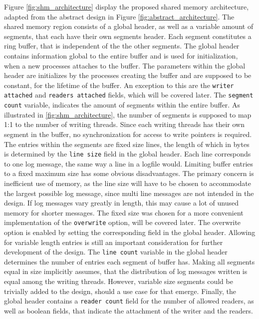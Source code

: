 Figure \ref{fig:shm_architecture} display the proposed shared memory architecture, adapted from the abstract design in Figure \ref{fig:abstract_architecture}.
The shared memory region consists of a global header, as well as a variable amount of segments,
that each have their own segments header. Each segment constitutes a ring buffer, that is independent of the
the other segments. The global header contains information global to
the entire buffer and is used for initialization, when a new processes attaches to the buffer. The parameters within the global
header are initializes by the processes creating the buffer and are supposed to be constant, for the lifetime of the buffer. An exception to this 
are the \texttt{writer attached} and \texttt{readers attached} fields, which will be covered later.
The \texttt{segment count} variable, indicates the amount of segments within the entire buffer. As illustrated
in \ref{fig:shm_architecture}, the number of segments is supposed to map 1:1 to the number 
of writing threads. Since each writing threads has their own segment in the buffer, no synchronization for access
to write pointers is required. The entries within the segments are fixed
size lines, the length of which in bytes is determined by the \texttt{line size} field in the global header. Each line corresponds
to one log message, the same way a line in a logfile would.  
Limiting buffer entries to a fixed maximum size has some obvious disadvantages. The primary concern
is inefficient use of memory, as the line size will have to be chosen to accommodate the largest possible log message, since multi line
messages are not intended in the design. If log messages vary greatly in length, this may cause a lot of unused memory
for shorter messages. The fixed size was chosen for a more convenient implementation of the \texttt{overwrite} option, will be covered later. The overwrite option is enabled by setting the corresponding field in the global header. 
Allowing for variable length entries is still an important consideration for further development of the design. The \texttt{line count} variable in the global header 
determines the number of entries each segment of buffer has. Making all segments equal in size implicitly assumes, that the distribution of log messages written
is equal among the writing threads. However, variable size segments could be trivially added to the design, should a use case for that emerge. 
Finally, the global header contains a \texttt{reader count} field for the number of allowed readers, as well as boolean fields, that indicate the attachment of the writer and the readers.
